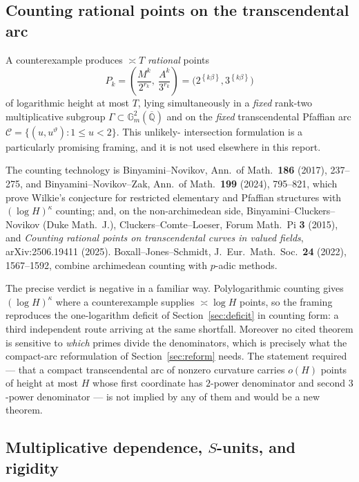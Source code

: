 \documentclass[11pt,oneside]{article}
\theoremstyle{definition}
\theoremstyle{remark}
\newcommand{\Abar}{\overline{\mathbb Q}}
\newcommand{\thetaq}{\vartheta}
\newcommand{\fract}[1]{\left\{#1\right\}}
\newcommand{\Qbar}{\Abar}
\begin{document}
\subsection{Counting rational points on the transcendental arc}

A counterexample produces $\asymp T$ \emph{rational} points
\[
  P_k=\left(\frac{M^k}{2^{r_k}},\ \frac{A^k}{3^{r_k}}\right)
   =\bigl(2^{\fract{k\beta}},3^{\fract{k\beta}}\bigr)
\]
of logarithmic height at most $T$, lying simultaneously in a \emph{fixed} rank-two
multiplicative subgroup $\Gamma\subset\mathbb G_m^2(\Qbar)$ and on the \emph{fixed}
transcendental Pfaffian arc $\mathcal C=\{(u,u^{\thetaq}):1\le u<2\}$.  This unlikely-
intersection formulation is a particularly promising framing, and it is not
used elsewhere in this report.

The counting technology is Binyamini--Novikov, Ann.\ of Math.\ \textbf{186} (2017), 237--275,
and Binyamini--Novikov--Zak, Ann.\ of Math.\ \textbf{199} (2024), 795--821, which prove
Wilkie's conjecture for restricted elementary and Pfaffian structures with $(\log H)^\kappa$
counting; and, on the non-archimedean side, Binyamini--Cluckers--Novikov (Duke Math.\ J.),
Cluckers--Comte--Loeser, Forum Math.\ Pi \textbf{3} (2015), and \emph{Counting rational points
on transcendental curves in valued fields}, arXiv:2506.19411 (2025).  Boxall--Jones--Schmidt,
J.\ Eur.\ Math.\ Soc.\ \textbf{24} (2022), 1567--1592, combine archimedean counting with
$p$-adic methods.

The precise verdict is negative in a familiar way.  Polylogarithmic counting gives
$(\log H)^\kappa$ where a counterexample supplies $\asymp\log H$ points, so the framing
reproduces the one-logarithm deficit of Section~\ref{sec:deficit} in counting form: a third
independent route arriving at the same shortfall.  Moreover no cited theorem is sensitive to
\emph{which} primes divide the denominators, which is precisely what the compact-arc
reformulation of Section~\ref{sec:reform} needs.  The statement required --- that a compact
transcendental arc of nonzero curvature carries $o(H)$ points of height at most $H$ whose first
coordinate has $2$-power denominator and second $3$-power denominator --- is not implied by any
of them and would be a new theorem.

\subsection{Multiplicative dependence, \texorpdfstring{$S$}{S}-units, and rigidity}
\end{document}
